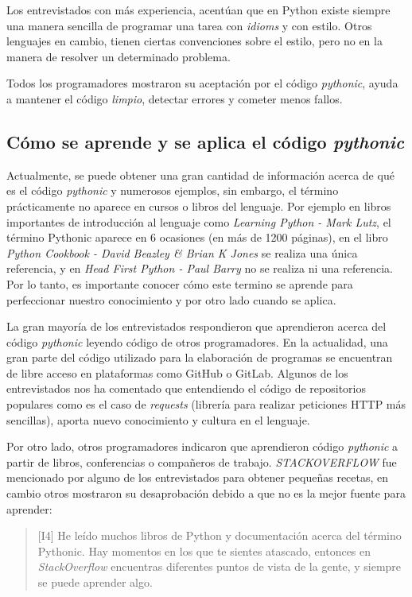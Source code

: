 \documentclass[a4paper, 12pt]{book}
\begin{document}
Los entrevistados con más experiencia, acentúan que en Python existe siempre una manera sencilla de programar una tarea con \textit{idioms} y con estilo. Otros lenguajes en cambio, tienen ciertas convenciones sobre el estilo, pero no en la manera de resolver un determinado problema.

Todos los programadores mostraron su aceptación por el código \textit{pythonic}, ayuda a mantener el código \textit{limpio}, detectar errores y cometer menos fallos.


\subsection{Cómo se aprende y se aplica el código \textit{pythonic}}

Actualmente, se puede obtener una gran cantidad de información acerca de qué es el código \textit{pythonic} y numerosos ejemplos, sin embargo, el término prácticamente no aparece en cursos o libros del lenguaje. Por ejemplo en libros importantes de introducción al lenguaje como \textit{Learning Python - Mark Lutz}, el término Pythonic aparece en 6 ocasiones (en más de 1200 páginas), en el libro \textit{Python Cookbook - David Beazley \& Brian K Jones} se realiza una única referencia, y en \textit{Head First Python - Paul Barry} no se realiza ni una referencia. Por lo tanto, es importante conocer cómo este termino se aprende para perfeccionar nuestro conocimiento y por otro lado cuando se aplica.

La gran mayoría de los entrevistados respondieron que aprendieron acerca del código \textit{pythonic} leyendo código de otros programadores. En la actualidad, una gran parte del código utilizado para la elaboración de programas se encuentran de libre acceso en plataformas como GitHub o GitLab. Algunos de los entrevistados nos ha comentado que entendiendo el código de repositorios populares como es el caso de \textit{requests} (librería para realizar peticiones HTTP más sencillas), aporta nuevo conocimiento y cultura en el lenguaje.

Por otro lado, otros programadores indicaron que aprendieron código \textit{pythonic} a partir de libros, conferencias o compañeros de trabajo. \textit{STACKOVERFLOW} fue mencionado por alguno de los entrevistados para obtener pequeñas recetas, en cambio otros mostraron su desaprobación debido a que no es la mejor fuente para aprender:

\begin{quote}
\small
    [I4] He leído muchos libros de Python y documentación acerca del término Pythonic. Hay momentos en los que te sientes atascado, entonces en \textit{StackOverflow} encuentras diferentes puntos de vista de la gente, y siempre se puede aprender algo.
\end{quote}
\end{document}

